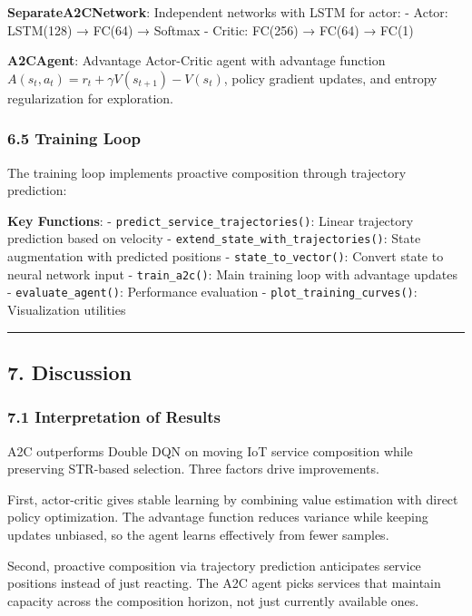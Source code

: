 \documentclass[
  10pt,
  twocolumn,
]{article}
\begin{document}
\textbf{SeparateA2CNetwork}: Independent networks with LSTM for actor: -
Actor: LSTM(128) → FC(64) → Softmax - Critic: FC(256) → FC(64) → FC(1)

\textbf{A2CAgent}: Advantage Actor-Critic agent with advantage function
\(A(s_t, a_t) = r_t + \gamma V(s_{t+1}) - V(s_t)\), policy gradient
updates, and entropy regularization for exploration.

\hypertarget{training-loop}{%
	\subsubsection{6.5 Training Loop}\label{training-loop}}

The training loop implements proactive composition through trajectory
prediction:

\textbf{Key Functions}: - \texttt{predict\_service\_trajectories()}:
Linear trajectory prediction based on velocity -
\texttt{extend\_state\_with\_trajectories()}: State augmentation with
predicted positions - \texttt{state\_to\_vector()}: Convert state to
neural network input - \texttt{train\_a2c()}: Main training loop with
advantage updates - \texttt{evaluate\_agent()}: Performance evaluation -
\texttt{plot\_training\_curves()}: Visualization utilities

\begin{center}\rule{0.5\linewidth}{0.5pt}\end{center}

\hypertarget{discussion}{%
	\subsection{7. Discussion}\label{discussion}}

\hypertarget{interpretation-of-results}{%
	\subsubsection{7.1 Interpretation of
		Results}\label{interpretation-of-results}}

A2C outperforms Double DQN on moving IoT service composition while
preserving STR-based selection. Three factors drive improvements.

First, actor-critic gives stable learning by combining value estimation
with direct policy optimization. The advantage function reduces variance
while keeping updates unbiased, so the agent learns effectively from
fewer samples.

Second, proactive composition via trajectory prediction anticipates
service positions instead of just reacting. The A2C agent picks services
that maintain capacity across the composition horizon, not just
currently available ones.
\end{document}
